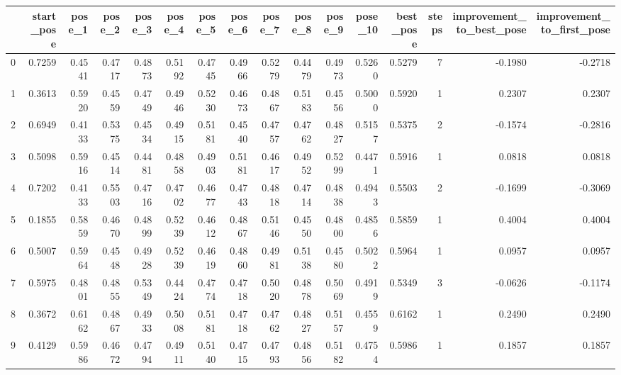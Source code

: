 \begin{tabular}{lrrrrrrrrrrrrrrr}
\toprule
{} &  start\_pose &  pose\_1 &  pose\_2 &  pose\_3 &  pose\_4 &  pose\_5 &  pose\_6 &  pose\_7 &  pose\_8 &  pose\_9 &  pose\_10 &  best\_pose &  steps &  improvement\_to\_best\_pose &  improvement\_to\_first\_pose \\
\midrule
0 &      0.7259 &  0.4541 &  0.4717 &  0.4873 &  0.5192 &  0.4745 &  0.4966 &  0.5279 &  0.4479 &  0.4973 &   0.5260 &     0.5279 &      7 &                   -0.1980 &                    -0.2718 \\
1 &      0.3613 &  0.5920 &  0.4559 &  0.4749 &  0.4946 &  0.5230 &  0.4673 &  0.4867 &  0.5183 &  0.4556 &   0.5000 &     0.5920 &      1 &                    0.2307 &                     0.2307 \\
2 &      0.6949 &  0.4133 &  0.5375 &  0.4534 &  0.4915 &  0.5181 &  0.4540 &  0.4757 &  0.4762 &  0.4827 &   0.5157 &     0.5375 &      2 &                   -0.1574 &                    -0.2816 \\
3 &      0.5098 &  0.5916 &  0.4514 &  0.4481 &  0.4858 &  0.4903 &  0.5181 &  0.4617 &  0.4952 &  0.5299 &   0.4471 &     0.5916 &      1 &                    0.0818 &                     0.0818 \\
4 &      0.7202 &  0.4133 &  0.5503 &  0.4716 &  0.4702 &  0.4677 &  0.4743 &  0.4818 &  0.4714 &  0.4838 &   0.4943 &     0.5503 &      2 &                   -0.1699 &                    -0.3069 \\
5 &      0.1855 &  0.5859 &  0.4670 &  0.4899 &  0.5239 &  0.4612 &  0.4867 &  0.5146 &  0.4550 &  0.4800 &   0.4856 &     0.5859 &      1 &                    0.4004 &                     0.4004 \\
6 &      0.5007 &  0.5964 &  0.4548 &  0.4928 &  0.5239 &  0.4619 &  0.4860 &  0.4981 &  0.5138 &  0.4580 &   0.5022 &     0.5964 &      1 &                    0.0957 &                     0.0957 \\
7 &      0.5975 &  0.4801 &  0.4855 &  0.5349 &  0.4424 &  0.4774 &  0.4718 &  0.5020 &  0.4878 &  0.5069 &   0.4919 &     0.5349 &      3 &                   -0.0626 &                    -0.1174 \\
8 &      0.3672 &  0.6162 &  0.4867 &  0.4933 &  0.5008 &  0.5181 &  0.4718 &  0.4762 &  0.4827 &  0.5157 &   0.4559 &     0.6162 &      1 &                    0.2490 &                     0.2490 \\
9 &      0.4129 &  0.5986 &  0.4672 &  0.4794 &  0.4911 &  0.5140 &  0.4715 &  0.4793 &  0.4856 &  0.5182 &   0.4754 &     0.5986 &      1 &                    0.1857 &                     0.1857 \\
\bottomrule
\end{tabular}
